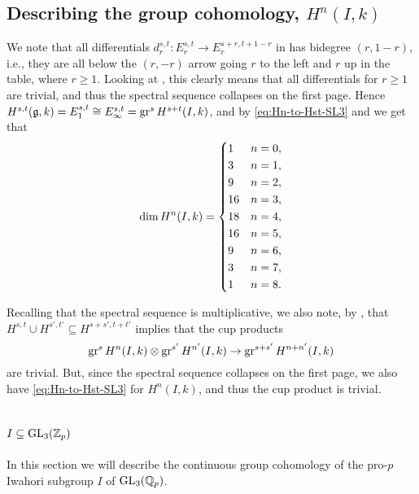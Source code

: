 \subsection{Describing the group cohomology, \texorpdfstring{$H^{n}(I,k)$}{Hn(I,k)}}%
\label{subsec:group-coh-SL3}

We note that all differentials $d_{r}^{s,t} \colon E_{r}^{s,t} \to E_{r}^{s+r,t+1-r}$ in  has bidegree $(r,1-r)$, i.e., they are all below the $(r,-r)$ arrow going $r$ to the left and $r$ up in the table, where $r \geq 1$. Looking at , this clearly means that all differentials for $r \geq 1$ are trivial, and thus the spectral sequence collapses on the first page. Hence $H^{s,t}(\mathfrak{g},k) = E_{1}^{s,t} \cong E_{\infty}^{s,t} = \operatorname{gr}^{s} H^{s+t}(I,k)$, and by \eqref{eq:Hn-to-Hst-SL3} and  we get that
\begin{equation}
  \label{eq:dim-HnI-SL3}
  \dim H^{n}(I,k) =
  \begin{dcases}
    1 & n=0, \\
    3 & n=1, \\
    9 & n=2, \\
    16 & n=3, \\
    18 & n=4, \\
    16 & n=5, \\
    9 & n=6, \\
    3 & n=7, \\
    1 & n=8.
  \end{dcases}
\end{equation}

Recalling that the spectral sequence is multiplicative, we also note, by , that $H^{s,t} \cup H^{s',t'} \subseteq H^{s+s',t+t'}$ implies that the cup products
\begin{equation*}
  \operatorname{gr}^{s} H^{n}(I,k) \otimes \operatorname{gr}^{s'} H^{n'}(I,k) \to \operatorname{gr}^{s+s'} H^{n+n'}(I,k)
\end{equation*}
are trivial. But, since the spectral sequence collapses on the first page, we also have \eqref{eq:Hn-to-Hst-SL3} for $H^{n}(I,k)$, and thus the cup product is trivial.

\section{\texorpdfstring{$I \subseteq \operatorname{GL}_{3}(\mathbb{Z}_{p})$}{I in GL3(Zp)}}%
\label{sec:Iwa-GL3}

In this section we will describe the continuous group cohomology of the pro-$p$ Iwahori subgroup $I$ of $\operatorname{GL}_{3}(\mathbb{Q}_{p})$.

